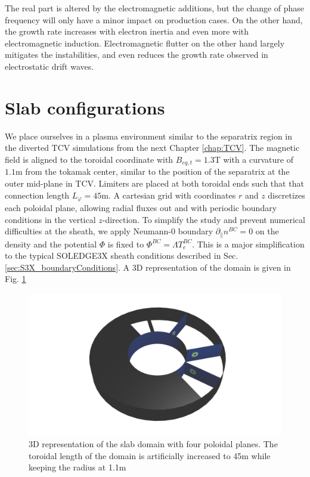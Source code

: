 The real part is altered by the electromagnetic additions, but the change of phase frequency will only have a minor impact on production cases. On the other hand, the growth rate increases with electron inertia and even more with electromagnetic induction. Electromagnetic flutter on the other hand largely mitigates the instabilities, and even reduces the growth rate observed in electrostatic drift waves.



\section{Slab configurations}
\label{sec:anal_SLAB}

We place ourselves in a plasma environment similar to the separatrix region in the diverted TCV simulations from the next Chapter \ref{chap:TCV}. The magnetic field is aligned to the toroidal coordinate with $B_{eq,t} = 1.3$T with a curvature of $1.1$m from the tokamak center, similar to the position of the separatrix at the outer mid-plane in TCV. Limiters are placed at both toroidal ends such that that connection length $L_\varphi = 45$m. A cartesian grid with coordinates $r$ and $z$ discretizes each poloidal plane, allowing radial fluxes out and with periodic boundary conditions in the vertical $z$-direction. To simplify the study and prevent numerical difficulties at the sheath, we apply Neumann-0 boundary $\partial_\parallel n^{BC} = 0$ on the density and the potential $\Phi$ is fixed to $\Phi^{BC} = \Lambda T_e^{BC}$. This is a major simplification to the typical SOLEDGE3X sheath conditions described in Sec. \ref{sec:S3X_boundaryConditions}. A 3D representation of the domain is given in Fig. \ref{fig:anal_slabDomain}


\begin{figure}[H]\centering
	\centering
	\includegraphics[width=.8\textwidth]{schemes/3DblobView.png}
	\caption[3D representation of the slab domain with four poloidal planes]{3D representation of the slab domain with four poloidal planes. The toroidal length of the domain is artificially increased to 45m while keeping the radius at 1.1m}
	\label{fig:anal_slabDomain}
\end{figure}



